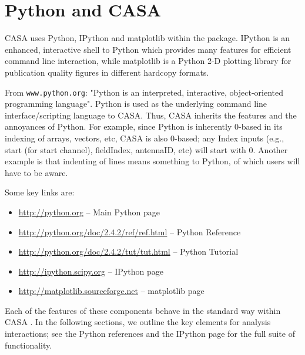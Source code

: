 

\chapter[Appendix: Python and CASA]{Python and CASA}
\label{chapter:python}

CASA uses Python, IPython and matplotlib within the package.
IPython is an enhanced, interactive shell to Python which provides
many features for efficient command line interaction, while
matplotlib is a Python 2-D plotting library for publication quality
figures in different hardcopy formats.

From {\tt www.python.org}: "Python is an interpreted, interactive,
object-oriented programming language".  Python is used as the
underlying command line interface/scripting language to CASA.  
Thus, CASA inherits the features and the annoyances of Python.  
For example, since Python is
inherently 0-based in its indexing of arrays, vectors, etc, CASA is
also 0-based; any Index inputs (e.g., start (for start channel),
fieldIndex, antennaID, etc) will start with 0.  Another example is
that indenting of lines means something to Python, of which users will
have to be aware.

Some key links are:

\begin{itemize}
   \item \url{http://python.org}  --  Main Python page
   \item \url{http://python.org/doc/2.4.2/ref/ref.html}  --  Python Reference
   \item \url{http://python.org/doc/2.4.2/tut/tut.html}  --  Python Tutorial
   \item \url{http://ipython.scipy.org}  --  IPython page
   \item \url{http://matplotlib.sourceforge.net}  --  matplotlib page
\end{itemize}

Each of the features of these components behave in the standard way
within CASA . In the following sections, we outline the key elements
for analysis interactions; see the Python references and the
IPython page for the full suite of functionality.

